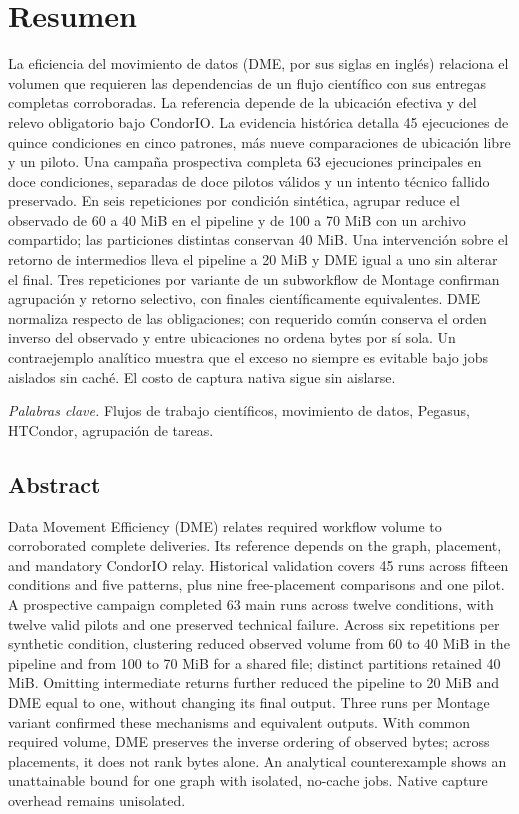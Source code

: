 \documentclass[11pt,a4paper]{report}
\begin{document}
\hypersetup{pageanchor=false}

\clearpage{}
\hypersetup{pageanchor=true}
\chapter*{Resumen}
La eficiencia del movimiento de datos (DME, por sus siglas en inglés) relaciona el volumen que requieren las dependencias de un flujo científico con sus entregas completas corroboradas. La referencia depende de la ubicación efectiva y del relevo obligatorio bajo CondorIO. La evidencia histórica detalla 45 ejecuciones de quince condiciones en cinco patrones, más nueve comparaciones de ubicación libre y un piloto. Una campaña prospectiva completa 63 ejecuciones principales en doce condiciones, separadas de doce pilotos válidos y un intento técnico fallido preservado. En seis repeticiones por condición sintética, agrupar reduce el observado de 60 a 40 MiB en el pipeline y de 100 a 70 MiB con un archivo compartido; las particiones distintas conservan 40 MiB. Una intervención sobre el retorno de intermedios lleva el pipeline a 20 MiB y DME igual a uno sin alterar el final. Tres repeticiones por variante de un subworkflow de Montage confirman agrupación y retorno selectivo, con finales científicamente equivalentes. DME normaliza respecto de las obligaciones; con requerido común conserva el orden inverso del observado y entre ubicaciones no ordena bytes por sí sola. Un contraejemplo analítico muestra que el exceso no siempre es evitable bajo jobs aislados sin caché. El costo de captura nativa sigue sin aislarse.

\smallskip\noindent\textit{Palabras clave.} Flujos de trabajo científicos, movimiento de datos, Pegasus, HTCondor, agrupación de tareas.

\section*{Abstract}
Data Movement Efficiency (DME) relates required workflow volume to corroborated complete deliveries. Its reference depends on the graph, placement, and mandatory CondorIO relay. Historical validation covers 45 runs across fifteen conditions and five patterns, plus nine free-placement comparisons and one pilot. A prospective campaign completed 63 main runs across twelve conditions, with twelve valid pilots and one preserved technical failure. Across six repetitions per synthetic condition, clustering reduced observed volume from 60 to 40 MiB in the pipeline and from 100 to 70 MiB for a shared file; distinct partitions retained 40 MiB. Omitting intermediate returns further reduced the pipeline to 20 MiB and DME equal to one, without changing its final output. Three runs per Montage variant confirmed these mechanisms and equivalent outputs. With common required volume, DME preserves the inverse ordering of observed bytes; across placements, it does not rank bytes alone. An analytical counterexample shows an unattainable bound for one graph with isolated, no-cache jobs. Native capture overhead remains unisolated.
\end{document}
